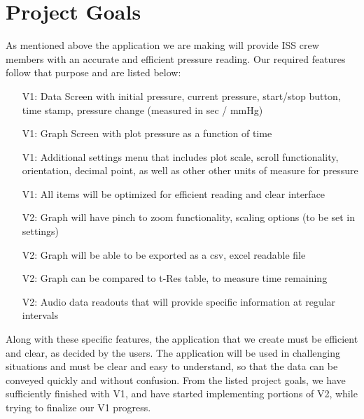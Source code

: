 \documentclass[onecolumn, draftclsnofoot,10pt, compsoc]{IEEEtran}
\begin{document}
\section{Project Goals}
As mentioned above the application we are making will provide ISS crew members with an accurate and efficient pressure reading.
Our required features follow that purpose and are listed below:
\begin{itemize}
\item[V1:] Data Screen with initial pressure, current pressure, start/stop button, time stamp, pressure change (measured in sec / mmHg)
\item[V1:] Graph Screen with plot pressure as a function of time
\item[V1:] Additional settings menu that includes plot scale, scroll functionality, orientation, decimal point, as well as other other units of measure for pressure
\item[V1:] All items will be optimized for efficient reading and clear interface
\item[V2:] Graph will have pinch to zoom functionality, scaling options (to be set in settings)
\item[V2:] Graph will be able to be exported as a csv, excel readable file
\item[V2:] Graph can be compared to t-Res table, to measure time remaining
\item[V2:] Audio data readouts that will provide specific information at regular intervals
\end{itemize}

Along with these specific features, the application that we create must be efficient and clear, as decided by the users.
The application will be used in challenging situations and must be clear and easy to understand, so that the data can be conveyed quickly and without confusion.
From the listed project goals, we have sufficiently finished with V1, and have started implementing portions of V2, while trying to finalize our V1 progress.



\end{document}
